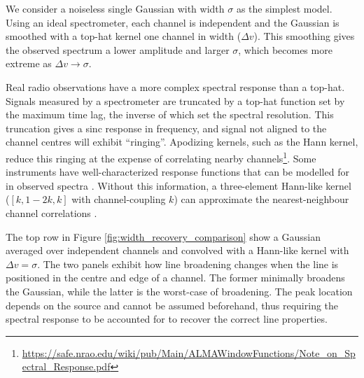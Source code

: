 \documentclass{rnaastex}
\begin{document}
We consider a noiseless single Gaussian with width $\sigma$ as the simplest model. Using an ideal spectrometer, each channel is independent and the Gaussian is smoothed with a top-hat kernel one channel in width ($\Delta v$). This smoothing gives the observed spectrum a lower amplitude and larger $\sigma$, which becomes more extreme as $\Delta v \rightarrow \sigma$.


Real radio observations have a more complex spectral response than a top-hat.
Signals measured by a spectrometer are truncated by a top-hat function set by the maximum time lag, the inverse of which set the spectral resolution.  This truncation gives a sinc response in frequency, and signal not aligned to the channel centres will exhibit ``ringing''. Apodizing kernels, such as the Hann kernel, reduce this ringing at the expense of correlating nearby channels\footnote{\url{https://safe.nrao.edu/wiki/pub/Main/ALMAWindowFunctions/Note_on_Spectral_Response.pdf}}.  Some instruments have well-characterized response functions that can be modelled for in observed spectra \citep{rosolowsky2008}.  Without this information, a three-element Hann-like kernel ($[k, 1 - 2k, k]$ with channel-coupling $k$) can approximate the nearest-neighbour channel correlations \citep{leroy2016}.

The top row in Figure \ref{fig:width_recovery_comparison} show a Gaussian averaged over independent channels and convolved with a Hann-like kernel with $\Delta v=\sigma$.  The two panels exhibit how line broadening changes when the line is positioned in the centre and edge of a channel. The former minimally broadens the Gaussian, while the latter is the worst-case of broadening.  The peak location depends on the source and cannot be assumed beforehand, thus requiring the spectral response to be accounted for to recover the correct line properties.


\end{document}
